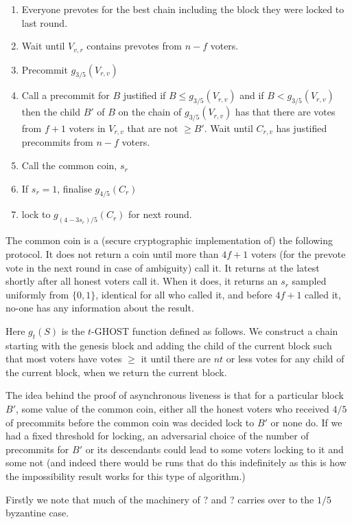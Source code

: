 \documentclass{article}
\begin{document}
{\begin{enumerate}
\item Everyone prevotes for the best chain including the block they were locked to last round.
\item Wait until $V_{v,r}$ contains prevotes from $n-f$ voters.
\item Precommit $g_{3/5}(V_{r,v})$
\item Call a precommit for $B$ justified if $B \leq g_{3/5}(V_{r,v})$ and if $B < g_{3/5}(V_{r,v})$ then the child $B'$ of $B$ on the chain of $g_{3/5}(V_{r,v})$ has that there are votes from $f+1$ voters in $V_{r,v}$ that are not $\geq B'$.
Wait until $C_{r,v}$ has justified precommits from $n-f$ voters. 
\item Call the common coin, $s_r$
\item If $s_r=1$, finalise $g_{4/5}(C_r)$
\item lock to $g_{(4-3s_r)/5}(C_r)$ for next round.
\end{enumerate}

The common coin is a (secure cryptographic implementation of) the following protocol. It does not return a coin until more than $4f+1$ voters (for the prevote vote in the next round in case of ambiguity) call it. It returns at the latest shortly after all honest voters call it.
 When it does, it returns an $s_r$ sampled uniformly from $\{0,1\}$, identical for all who called it, and before $4f+1$ called it, no-one has any information about the result.

Here $g_{t}(S)$ is the $t$-GHOST function defined as follows. We construct a chain starting with the genesis block and adding the child of the current block such that most voters have votes $\geq$ it until there are $nt$ or less votes for any child of the current block, when we return the current block.

The idea behind the proof of asynchronous liveness is that for a particular block $B'$, some value of the common coin, either all the honest voters who received $4/5$ of precommits before the common coin was decided lock to $B'$ or none do. If we had a fixed threshold for locking, an adversarial choice of the number of precommits for $B'$ or its descendants could lead to some voters locking to it and some not (and indeed there would be runs that do this indefinitely as this is how the impossibility result works for this type of algorithm.)

Firstly we note that much of the machinery of ? and ? carries over to the $1/5$ byzantine case.

}
\end{document}
